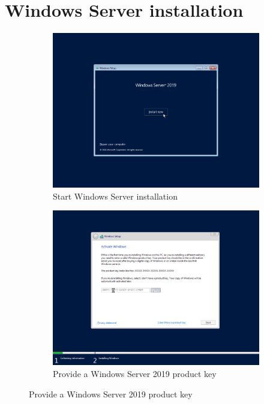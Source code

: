 \section{Windows Server installation}
\begin{figure}[!htb]
	\begin{subfigure}{0.5\textwidth}
		\captionsetup{width=0.8\linewidth}
		\includegraphics[width=0.9\linewidth]{img/Methodologie/Migration4.png}
		\centering
		\caption{Start Windows Server installation}
	\end{subfigure}
	\begin{subfigure}{0.5\textwidth}
		\captionsetup{width=0.8\linewidth}
		\includegraphics[width=0.9\linewidth]{img/Methodologie/Migration5.png} 
		\centering
		\caption{Provide a Windows Server 2019 product key}
	\end{subfigure}
\end{figure}
